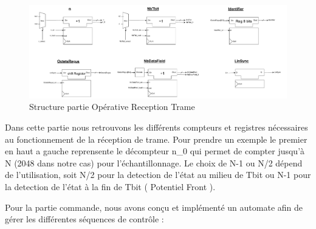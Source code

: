 \begin{figure}[H]
    \centering
    \includegraphics[width=0.95\linewidth]{images/inter/Structure_Reception_trame.pdf}
    \caption{Structure partie Opérative Reception Trame}
    \label{fig:placeholder}
\end{figure}

Dans cette partie nous retrouvons les différents compteurs et registres nécessaires au fonctionnement de la réception de trame. Pour prendre un exemple le premier en haut a gauche reprensente le décompteur n\_0 qui permet de compter jusqu'à N (2048 dans notre cas) pour l'échantillonnage. Le choix de N-1 ou N/2 dépend de l'utilisation, soit N/2 pour la detection de l'état au milieu de Tbit ou N-1 pour la detection de l'état à la fin de Tbit ( Potentiel Front ).
\newline

Pour la partie commande, nous avons conçu et implémenté un automate afin de gérer les différentes séquences de contrôle : 
\newline

